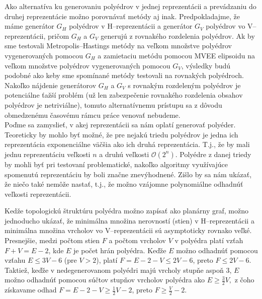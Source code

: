 Ako alternatíva ku generovaniu polyédrov v jednej reprezentácii a prevádzaniu do druhej reprezentácie možno porovnávať metódy aj inak. 
Predpokladajme, že máme generátor $G_H$ polyédrov v H--reprezentácii a generátor $G_V$ polyédrov vo V--reprezentácii, pričom $G_H$ a $G_V$ generujú z rovnakého rozdelenia polyédrov.
Ak by sme testovali Metropolis--Hastings metódy na veľkom množstve polyédrov vygenerovaných pomocou $G_H$ a zamietaciu metódu pomocou MVEE elipsoidu na veľkom množstve polyédrov vygenerovaných pomocou $G_V$, výsledky budú podobné ako keby sme spomínané metódy testovali na rovnakých polyédroch.
Nakoľko nájdenie generátorov $G_H$ a $G_V$ s rovnakým rozdeleným polyédrov je potenciálne ťažší problém (už len zabezpečenie rovnakého rozdelenia obsahov polyédrov je netriviálne), tomuto alternatívnemu prístupu sa z dôvodu obmedzenému časovému rámcu práce venovať nebudeme.\\


Poďme sa zamyslieť, v akej reprezentácii sa nám oplatí generovať polyéder. Teoreticky by mohlo byť možné, že pre nejakú triedu polyédrov je jedna ich reprezentácia exponenciálne väčšia ako ich druhá reprezentácia. T.j., že by mali jednu reprezentáciu veľkosti $n$ a druhú veľkosti $\mathcal O(2^n)$. Polyédre z danej triedy by mohli byť pri testovaní problematické, nakoľko algoritmy využívajúce spomenutú reprezentáciu by boli značne znevýhodnené. Zišlo by sa nám ukázať, že niečo také nemôže nastať, t.j., že možno vzájomne polynomiálne odhadnúť veľkosti reprezentácii.

Kedže topologickú štruktúru polyédra možno zapísať ako planárny graf, možno jednoducho ukázať, že minimálna množina nerovností (stien) v H--reprezentácii a minimálna množina vrcholov vo V--reprezentácii sú asymptoticky rovnako veľké.
Presnejšie, medzi počtom stien $F$ a počtom vrcholov $V$ v polyédra platí vzťah $F+V=E-2$, kde $E$ je počet hrán polyédra. Keďže $E$ možno odhadnúť pomocou vzťahu $E \le 3V-6$ (pre $V>2$), platí $F=E-2-V \leq 2V-6$, preto $F \leq 2V-6$. Taktiež, keďže v nedegenerovanom polyédri majú vrcholy stupňe aspoň $3$, $E$ možno odhadnúť pomocou súčtov stupňov vrcholov polyédra ako $E \geq \frac{3}{2}V,$ z čoho získavame odhad $F=E-2-V \geq \frac 1 2 V-2$, preto $F \geq \frac V 2 -2$.

